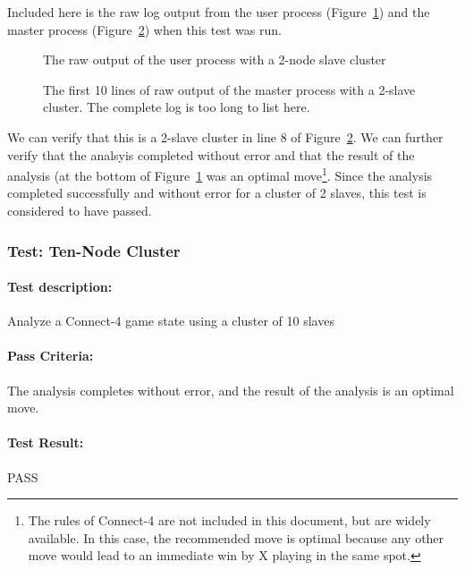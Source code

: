 \documentclass[pdftex,12pt,a4paper]{article}
\begin{document}
Included here is the raw log output from the user process (Figure~\ref{fig:duo-user-3}) and the master process (Figure~\ref{fig:duo-master-3}) when this test was run. 

\begin{figure}[h]

\caption{The raw output of the user process with a 2-node slave cluster}
\label{fig:duo-user-3}
\end{figure}

\begin{figure}[h]

\caption{The first 10 lines of raw output of the master process with a 2-slave cluster. The complete log is too long to list here.}
\label{fig:duo-master-3}
\end{figure}

We can verify that this is a 2-slave cluster in line 8 of Figure~\ref{fig:duo-master-3}. We can further verify that the analsyis completed without error and that the result of the analysis (at the bottom of Figure~\ref{fig:duo-user-3} was an optimal move\footnote{The rules of Connect-4 are not included in this document, but are widely available. In this case, the recommended move is optimal because any other move would lead to an immediate win by X playing in the same spot.}. Since the analysis completed successfully and without error for a cluster of 2 slaves, this test is considered to have passed.

\subsubsection{\textbf{Test:} Ten-Node Cluster}

\paragraph{Test description:} Analyze a Connect-4 game state using a cluster of 10 slaves

\paragraph{Pass Criteria:} The analysis completes without error, and the result of the analysis is an optimal move.

\paragraph{Test Result:} PASS
\end{document}
